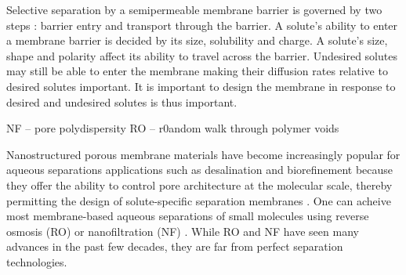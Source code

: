 \documentclass{article}
\begin{document}

 
  Selective separation by a semipermeable membrane barrier is governed by two
  steps : barrier entry and transport through the barrier. A solute's ability to
  enter a membrane barrier is decided by its size, solubility and charge. A solute's
  size, shape and polarity affect its ability to travel across the barrier. Undesired
  solutes may still be able to enter the membrane making their diffusion rates
  relative to desired solutes important. It is important to design the membrane in response
  to desired and undesired solutes is thus important. 

  NF -- pore polydispersity
  RO -- r0andom walk through polymer voids

  Nanostructured porous membrane materials have become increasingly popular for
  aqueous separations applications such as desalination and biorefinement because
  they offer the ability to control pore architecture at the molecular scale,
  thereby permitting the design of solute-specific separation membranes
  \cite{humplik_nanostructured_2011}. One can acheive most membrane-based aqueous separations of
  small molecules using reverse osmosis (RO) or nanofiltration
  (NF) \cite{van_der_bruggen_review_2003}. While RO and NF have seen many
  advances in the past few decades, they are far from perfect separation
  technologies. 

\end{document}
